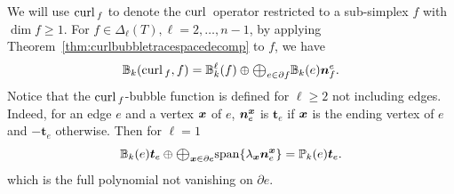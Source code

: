 \documentclass[mathpazo]{cicp}
\newcommand{\Oplus}{\ensuremath{\vcenter{\hbox{\scalebox{1.5}{$\oplus$}}}}}
\begin{document}

%

We will use ${\rm curl\,}_f$ to denote the ${\rm curl\,}$ operator restricted to a sub-simplex $f$ with $\dim f \geq 1$. For $f\in\Delta_{\ell}(T), \ell=2,\ldots, n-1$, by applying Theorem~\ref{thm:curlbubbletracespacedecomp} to $f$, we have
\begin{equation}\label{eq:curlfbubble}
\mathbb B_k(\curl_f, f) = \mathbb B_{k}^{\ell}(f) \oplus \Oplus_{e\in \partial f}\mathbb B_{k}( e) \boldsymbol{n}_{f}^e.
\end{equation}
Notice that the ${\rm curl\,}_f$-bubble function is defined for $\ell \geq 2$ not including edges. 
Indeed, for an edge $e$ and a vertex ${\boldsymbol x}$ of $e$, $\boldsymbol{n}_{e}^{\boldsymbol x}$ is $\boldsymbol{t}_{e}$ if $\boldsymbol x$ is the ending vertex of $e$ and $-\boldsymbol{t}_{e}$ otherwise. Then for $\ell = 1$
\begin{equation}\label{eq:curlebubble}
\mathbb B_{k}( e) \bs t_e \oplus \Oplus_{{\bs x}\in \partial e} {\rm span}\{\lambda_{\bs x} \boldsymbol{n}_{e}^{\bs x}\} = \mathbb P_{k}(e)\bs t_e.
\end{equation}
which is the full polynomial not vanishing on $\partial e$. 
\end{document}
